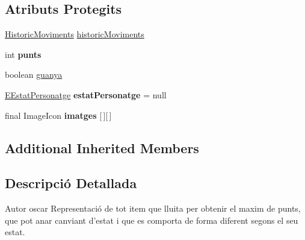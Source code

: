 \subsection*{Atributs Protegits}
\begin{DoxyCompactItemize}
\item 
\hyperlink{classlogica_1_1historic__moviments_1_1_historic_moviments}{Historic\+Moviments} \hyperlink{classlogica_1_1_personatge_a86322efbc950e2954fe2a8cde806bbd9}{historic\+Moviments}
\item 
\hypertarget{classlogica_1_1_personatge_a2a46aceef25eeae45072cf2e6ece1506}{int {\bfseries punts}}\label{classlogica_1_1_personatge_a2a46aceef25eeae45072cf2e6ece1506}

\item 
boolean \hyperlink{classlogica_1_1_personatge_a0c30dc6ca85f941043ae4a27e7583c67}{guanya}
\item 
\hypertarget{classlogica_1_1_personatge_ac9325217d5c36660a38dd20eb240b278}{\hyperlink{enumlogica_1_1_personatge_1_1_e_estat_personatge}{E\+Estat\+Personatge} {\bfseries estat\+Personatge} = null}\label{classlogica_1_1_personatge_ac9325217d5c36660a38dd20eb240b278}

\item 
\hypertarget{classlogica_1_1_personatge_a60cb339a9fd71a85c7522deb3984a1f4}{final Image\+Icon {\bfseries imatges} \mbox{[}$\,$\mbox{]}\mbox{[}$\,$\mbox{]}}\label{classlogica_1_1_personatge_a60cb339a9fd71a85c7522deb3984a1f4}

\end{DoxyCompactItemize}
\subsection*{Additional Inherited Members}


\subsection{Descripció Detallada}
\begin{DoxyAuthor}{Autor}
oscar Representació de tot item que lluita per obtenir el maxim de punts, que pot anar canviant d'estat i que es comporta de forma diferent segons el seu estat. 
\end{DoxyAuthor}


